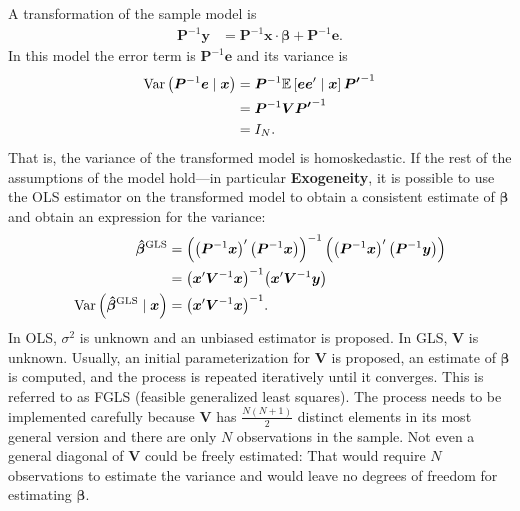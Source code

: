 \noindent A transformation of the sample model is 
\begin{align}
	{\bm{P}}^{-1} \bm{y} & = {\bm{P}}^{-1} \bm{x} \cdot \bm{\beta} + {\bm{P}}^{-1} \bm{e}. 
\end{align}
\noindent In this model the error term is ${\bm{P}}^{-1} \bm{e}$ and its variance is 
\begin{align}
	\operatorname{Var} \left( {\bm{P}}^{-1} \bm{e} \mid \bm{x} \right) & = {\bm{P}}^{-1} \mathbb{E} \left[ \bm{e} \bm{e}' \mid \bm{x} \right] {\bm{P'}}^{-1} \nonumber \\ 
	& = {\bm{P}}^{-1} \bm{V} {\bm{P'}}^{-1} \nonumber \\
	& = I_N. 
\end{align}
\noindent That is, the variance of the transformed model is homoskedastic. If the rest of the assumptions of the model hold---in particular \textbf{Exogeneity}, it is possible to use the OLS estimator on the transformed model to  obtain a consistent estimate of $\bm{\beta}$ and obtain an expression for the variance:
\begin{align}
	\bm{\hat{\beta}}^{\text{GLS}} & = {\left( \left( {\bm{P}}^{-1} \bm{x} \right)' \left( {\bm{P}}^{-1} \bm{x} \right) \right)}^{-1} \left( \left( {\bm{P}}^{-1} \bm{x} \right)' \left( {\bm{P}}^{-1} \bm{y} \right) \right)  \nonumber \\
							& = {\left( \bm{x}' \bm{V}^{-1} \bm{x} \right)}^{-1} {\left( \bm{x}' \bm{V}^{-1} \bm{y} \right)} \nonumber \\ 
	\operatorname{Var} \left( \bm{\hat{\beta}}^{\text{GLS}} \mid \bm{x} \right) & =  {\left( \bm{x}' \bm{V}^{-1} \bm{x} \right)}^{-1}.
\end{align}
\noindent In OLS, $\sigma^2$ is unknown and an unbiased estimator is proposed. In GLS, $\bm{V}$ is unknown. Usually, an initial parameterization for $\bm{V}$ is proposed, an estimate of $\bm{\beta}$ is computed, and the process is repeated iteratively until it converges. This is referred to as FGLS (feasible generalized least squares). The process needs to be implemented carefully because $\bm{V}$ has $\frac{N \left ( N + 1 \right)}{2}$ distinct elements in its most general version and there are only $N$ observations in the sample. Not even a general diagonal of $\bm{V}$ could be freely estimated: That would require $N$ observations to estimate the variance and would leave no degrees of freedom for estimating $\bm{\beta}$.\\

